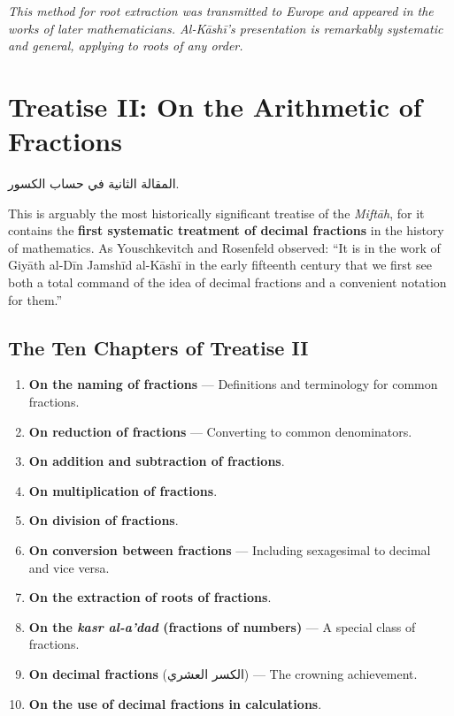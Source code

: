 \documentclass[11pt,a4paper]{article}
\newenvironment{arabicbox}{%
  \begin{framed}
  \begin{minipage}{\linewidth-2\fboxsep-2\fboxrule}
  \setlength{\parindent}{0pt}
  \linespread{1.3}\selectfont
}{%
  \end{minipage}
  \end{framed}
}
\newcommand{\cnote}[1]{\textcolor{notecolor}{\textit{#1}}}
\newcommand{\ar}[1]{{\arabicfont\beginR #1\endR}}
\begin{document}
\cnote{This method for root extraction was transmitted to Europe and
appeared in the works of later mathematicians. Al-K\=ash\=i's presentation
is remarkably systematic and general, applying to roots of any order.}
\clearpage

\section{Treatise II: On the Arithmetic of Fractions}
\label{sec:treatise2}

\begin{arabicbox}
\begin{Arabic}
المقالة الثانية في حساب الكسور.
\end{Arabic}
\end{arabicbox}

\vspace{0.3cm}

\noindent This is arguably the most historically significant treatise of
the \textit{Mift\=ah}, for it contains the \textbf{first systematic
treatment of decimal fractions} in the history of mathematics. As
Youschkevitch and Rosenfeld observed: ``It is in the work of Giy\=ath
al-D\=in Jamsh\=id al-K\=ash\=i in the early fifteenth century that we first see
both a total command of the idea of decimal fractions and a convenient
notation for them.''

\subsection{The Ten Chapters of Treatise II}

\begin{enumerate}[label=\textbf{Ch.\arabic*:}]
  \item \textbf{On the naming of fractions} --- Definitions and
  terminology for common fractions.
  \item \textbf{On reduction of fractions} --- Converting to common
  denominators.
  \item \textbf{On addition and subtraction of fractions}.
  \item \textbf{On multiplication of fractions}.
  \item \textbf{On division of fractions}.
  \item \textbf{On conversion between fractions} --- Including sexagesimal
  to decimal and vice versa.
  \item \textbf{On the extraction of roots of fractions}.
  \item \textbf{On the \textit{kasr al-a'dad} (fractions of numbers)} ---
  A special class of fractions.
  \item \textbf{On decimal fractions} (\ar{الكسر العشري}) --- The
  crowning achievement.
  \item \textbf{On the use of decimal fractions in calculations}.
\end{enumerate}
\end{document}
